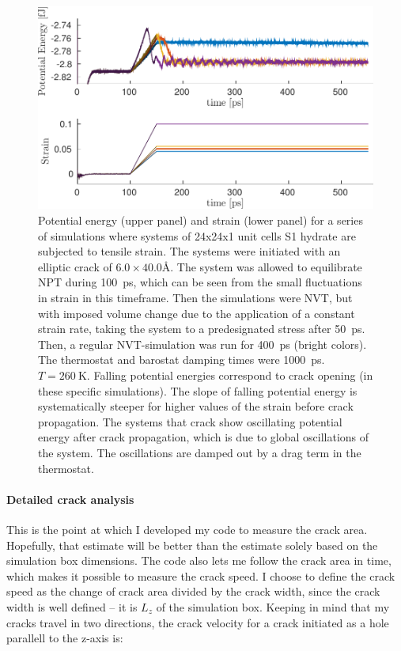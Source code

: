 \begin{figure}
\includegraphics[width=\textwidth]{../figures/thesis/proof_of_concept_poteng_strain.pdf}
\caption{Potential energy (upper panel) and strain (lower panel) for a series of simulations where systems of 24x24x1 unit cells S1 hydrate are subjected to tensile strain. The systems were initiated with an elliptic crack of $6.0 \times 40.0 \si{\angstrom}$. The system was allowed to equilibrate NPT during \SI{100}{\pico\second}, which can be seen from the small fluctuations in strain in this timeframe. Then the simulations were NVT, but with imposed volume change due to the application of a constant strain rate, taking the system to a predesignated stress after \SI{50}{\pico\second}. Then, a regular NVT-simulation was run for \SI{400}{\pico\second} (bright colors). The thermostat and barostat damping times were \SI{1000}{\pico\second}. $T=\SI{260}{\kelvin}$. Falling potential energies correspond to crack opening (in these specific simulations). The slope of falling potential energy is systematically steeper for higher values of the strain before crack propagation. The systems that crack show oscillating potential energy after crack propagation, which is due to global oscillations of the system. The oscillations are damped out by a drag term in the thermostat. }
\label{fig:proof_of_concept_crack}
\end{figure}

\paragraph{Detailed crack analysis}
This is the point at which I developed my code to measure the crack area. Hopefully, that estimate will be better than the estimate solely based on the simulation box dimensions. The code also lets me follow the crack area in time, which makes it possible to measure the crack speed. I choose to define the crack speed as the change of crack area divided by the crack width, since the crack width is well defined – it is $L_z$ of the simulation box. Keeping in mind that my cracks travel in two directions, the crack velocity for a crack initiated as a hole parallell to the z-axis is:

